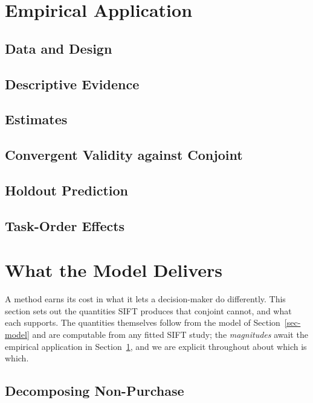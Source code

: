 \documentclass[
  letterpaper,
  DIV=11,
  numbers=noendperiod]{scrartcl}
\begin{document}
\section{Empirical Application}\label{sec-analysis}

\subsection{Data and Design}\label{data-and-design}

\subsection{Descriptive Evidence}\label{descriptive-evidence}

\subsection{Estimates}\label{estimates}

\subsection{Convergent Validity against
Conjoint}\label{convergent-validity-against-conjoint}

\subsection{Holdout Prediction}\label{holdout-prediction}

\subsection{Task-Order Effects}\label{task-order-effects}

\section{What the Model Delivers}\label{sec-managerial}

A method earns its cost in what it lets a decision-maker do differently.
This section sets out the quantities SIFT produces that conjoint cannot,
and what each supports. The quantities themselves follow from the model
of Section~\ref{sec-model} and are computable from any fitted SIFT
study; the \emph{magnitudes} await the empirical application in
Section~\ref{sec-analysis}, and we are explicit throughout about which
is which.

\subsection{Decomposing
Non-Purchase}\label{sec-managerial-decomposition}
\end{document}
